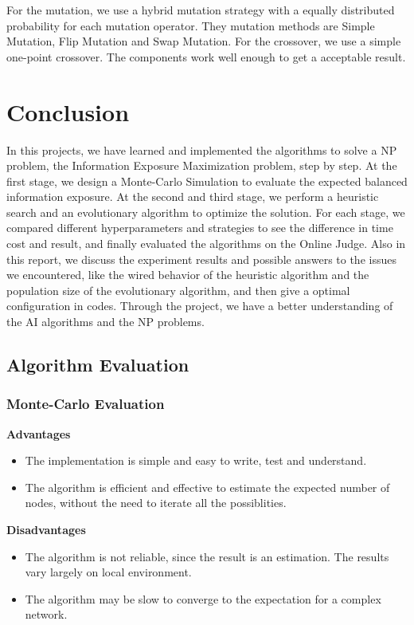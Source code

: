 \documentclass{article}
\begin{document}
For the mutation, we use a hybrid mutation strategy with a equally distributed probability for each mutation operator. They mutation methods are Simple Mutation, Flip Mutation and Swap Mutation. For the crossover, we use a simple one-point crossover. The components work well enough to get a acceptable result.

\section{Conclusion}

In this projects, we have learned and implemented the algorithms to solve a NP problem, the Information Exposure Maximization problem, step by step. At the first stage, we design a Monte-Carlo Simulation to evaluate the expected balanced information exposure. At the second and third stage, we perform a heuristic search and an evolutionary algorithm to optimize the solution. For each stage, we compared different hyperparameters and strategies to see the difference in time cost and result, and finally evaluated the algorithms on the Online Judge. Also in this report, we discuss the experiment results and possible answers to the issues we encountered, like the wired behavior of the heuristic algorithm and the population size of the evolutionary algorithm, and then give a optimal configuration in codes. Through the project, we have a better understanding of the AI algorithms and the NP problems.

\subsection{Algorithm Evaluation}

\subsubsection{Monte-Carlo Evaluation}
\textbf{Advantages}
\begin{itemize}
    \item The implementation is simple and easy to write, test and understand.
    \item The algorithm is efficient and effective to estimate the expected number of nodes, without the need to iterate all the possiblities.
\end{itemize}
\textbf{Disadvantages}
\begin{itemize}
    \item The algorithm is not reliable, since the result is an estimation. The results vary largely on local environment.
    \item The algorithm may be slow to converge to the expectation for a complex network.
\end{itemize}
\end{document}
